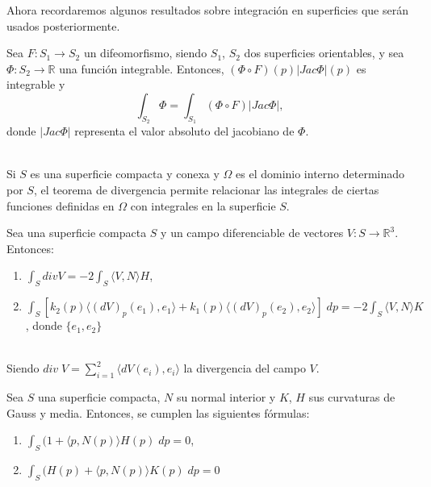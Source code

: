 Ahora recordaremos algunos resultados sobre integración en superficies que serán usados posteriormente.
${}$\\

\begin{teorema}
	Sea $F : S_1 \to S_2$ un difeomorfismo, siendo $S_1$, $S_2$ dos superficies orientables, y sea $\Phi : S_2 \to \mathbb{R}$ una función integrable. Entonces, $(\Phi \circ F)(p)|Jac \Phi|(p)$ es integrable y
	\[
	\int_{S_2} \Phi = \int_{S_1} (\Phi \circ F)|Jac \Phi|,
	\]
	donde $|Jac \Phi|$ representa el valor absoluto del jacobiano de $\Phi$.
\end{teorema}
${ }$\\


Si $S$ es una superficie compacta y conexa y $\Omega$ es el dominio interno determinado por $S$, el teorema de divergencia permite relacionar las integrales de ciertas funciones definidas en $\Omega$ con integrales en la superficie $S$.
${ }$\\

\begin{teorema} \label{teo:divergencia}
	Sea una superficie compacta $S$ y un campo diferenciable de vectores $V : S \to \mathbb{R}^3$. Entonces:
	\begin{enumerate}
		\item $\int_S div V = -2 \int_S \langle V, N \rangle H$,
		\item $\int_S [k_2(p) \langle (dV)_p(e_1), e_1\rangle + k_1(p) \langle (dV)_p(e_2), e_2 \rangle ] \; dp = -2 \int_S \langle V, N \rangle K$, donde $\{ e_1, e_2 \}$
	\end{enumerate}
\end{teorema}
${}$\\

Siendo $div \; V = \sum_{i=1}^{2} \langle dV(e_i), e_i \rangle $ la divergencia del campo $V$.
${ }$\\

\begin{teorema}
	Sea $S$ una superficie compacta, $N$ su normal interior y $K$, $H$ sus curvaturas de Gauss y media. Entonces, se cumplen las siguientes fórmulas:
	\begin{enumerate}
		\item $\int_S (1 + \langle p, N(p) \rangle H(p) \; dp = 0$,
		\item $\int_S (H(p) + \langle p, N(p) \rangle K(p) \; dp = 0$
	\end{enumerate}
\end{teorema}
${ }$\\







